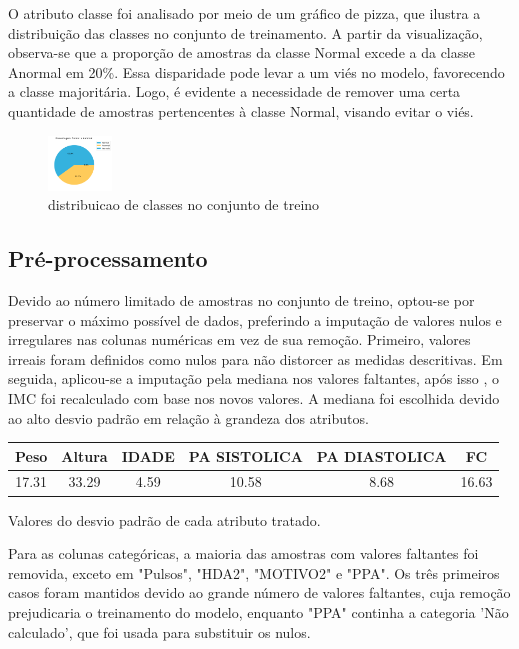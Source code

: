 \documentclass[10pt, conference, compsocconf]{IEEEtran}
\begin{document}
O atributo classe foi analisado por meio de um gráfico de pizza, que ilustra a distribuição das classes no conjunto de treinamento. 
A partir da visualização, observa-se que a proporção de amostras da classe Normal excede a da classe Anormal em 20\%. 
Essa disparidade pode levar a um viés no modelo, favorecendo a classe majoritária. Logo, é evidente a necessidade de remover uma 
certa quantidade de amostras pertencentes à classe Normal, visando evitar o viés.

\begin{figure}[htbp]
  \centering
  \includegraphics[width=0.15\textwidth]{distribuicao_classe.png}
  \tiny{\caption{distribuicao de classes no conjunto de treino}}
  \label{fig:classe}
\end{figure}


\subsection{Pré-processamento}
Devido ao número limitado de amostras no conjunto de treino, optou-se por preservar o máximo possível de dados, preferindo a imputação de valores nulos e irregulares nas colunas numéricas em vez de sua remoção. Primeiro, valores irreais foram definidos como nulos para não distorcer as medidas descritivas. Em seguida, aplicou-se a imputação pela mediana nos valores faltantes, após isso , o IMC foi recalculado com base nos novos valores. A mediana foi escolhida devido ao alto desvio padrão em relação à grandeza dos atributos.

\vspace{0.3cm}
\begin{center}
{\scriptsize
\begin{tabular}{|c|c|c|c|c|c|}
\hline 
Peso & Altura & IDADE & PA SISTOLICA & PA DIASTOLICA & FC \\ 
\hline
17.31   & 33.29   & 4.59 & 10.58 & 8.68 & 16.63   \\ 
\hline
\end{tabular}
}
\vspace{0.1cm}
\par {\scriptsize Valores do desvio padrão de cada atributo tratado.}
\end{center}
\vspace{0.2cm}


Para as colunas categóricas, a maioria das amostras com valores faltantes foi removida, exceto em "Pulsos", "HDA2", "MOTIVO2" e "PPA". Os três primeiros casos foram mantidos devido ao grande número de valores faltantes, cuja remoção prejudicaria o treinamento do modelo, enquanto "PPA" continha a categoria 'Não calculado', que foi usada para substituir os nulos.
\end{document}
